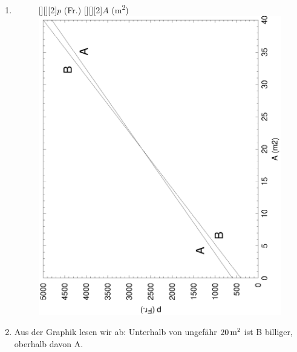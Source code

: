 \documentclass[%
11pt,%
twoside,%
titlepage,%
german,%
]{scrartcl}
\begin{document}
\begin{enumerate}
\begin{enumerate}
    \item \mbox{}
      \begin{figure}[h]
        \centering
        [][][2]{$p$ (Fr.)} [][][2]{$A$ (\unit{m^2})}
        \includegraphics[angle=-90,width=\columnwidth]{pictures/firmen.eps}
      \end{figure}
    \item Aus der Graphik lesen wir ab: Unterhalb von ungef\"ahr $\unit[20]{m^2}$ ist B billiger, oberhalb davon A.


\end{enumerate}
\end{enumerate}
\end{document}
